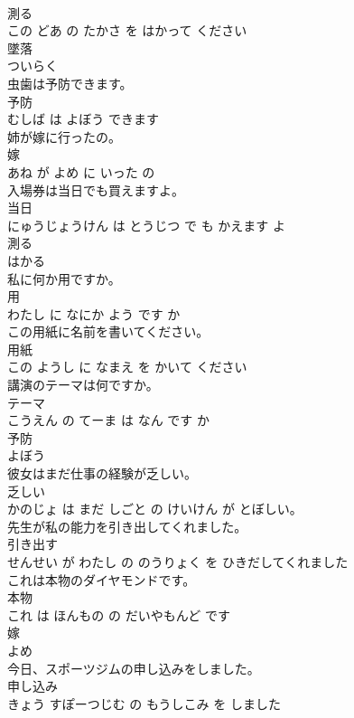 \documentclass[8pt]{extreport}
\begin{document}
\begin{CJK}{UTF8}{min}
\\	測る 
\\	この どあ の たかさ を はかって ください			
\\	墜落	
\\	ついらく			
\\	虫歯は予防できます。	
\\	予防 
\\	むしば は よぼう できます			
\\	姉が嫁に行ったの。	
\\	嫁 
\\	あね が よめ に いった の			
\\	入場券は当日でも買えますよ。	
\\	当日 
\\	にゅうじょうけん は とうじつ で も かえます よ			
\\	測る	
\\	はかる			
\\	私に何か用ですか。	
\\	用 
\\	わたし に なにか よう です か			
\\	この用紙に名前を書いてください。	
\\	用紙 
\\	この ようし に なまえ を かいて ください			
\\	講演のテーマは何ですか。	
\\	テーマ 
\\	こうえん の てーま は なん です か			
\\	予防	
\\	よぼう			
\\	彼女はまだ仕事の経験が乏しい。	
\\	乏しい 
\\	かのじょ は まだ しごと の けいけん が とぼしい。			
\\	先生が私の能力を引き出してくれました。	
\\	引き出す 
\\	せんせい が わたし の のうりょく を ひきだしてくれました			
\\	これは本物のダイヤモンドです。	
\\	本物 
\\	これ は ほんもの の だいやもんど です			
\\	嫁	
\\	よめ			
\\	今日、スポーツジムの申し込みをしました。	
\\	申し込み 
\\	きょう すぽーつじむ の もうしこみ を しました			

\end{CJK}
\end{document}
